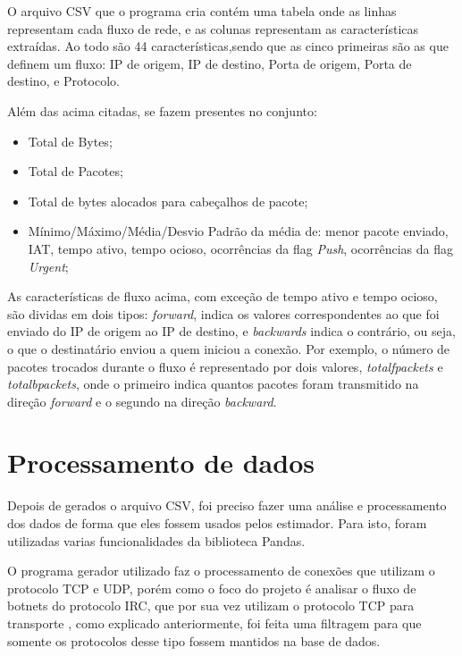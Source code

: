 O arquivo CSV que o programa cria contém uma tabela onde as linhas representam cada fluxo de rede, e as colunas representam as características extraídas. Ao todo são 44 características,sendo que as cinco primeiras são as que definem um fluxo: IP de origem, IP de destino, Porta de origem, Porta de destino, e Protocolo.

Além das acima citadas, se fazem presentes no conjunto:

\begin{itemize}
    \item Total de Bytes;
    \item Total de Pacotes;
    \item Total de bytes alocados para cabeçalhos de pacote;
    \item Mínimo/Máximo/Média/Desvio Padrão da média de: menor pacote enviado, IAT, tempo ativo, tempo ocioso, ocorrências da flag \textit{Push}, ocorrências da flag \textit{Urgent};
\end{itemize}

As características de fluxo acima, com exceção de tempo ativo e tempo ocioso, são dividas em dois tipos: \textit{forward}, indica os valores correspondentes ao que foi enviado do IP de origem ao IP de destino, e \textit{backwards} indica o contrário, ou seja, o que o destinatário enviou a quem iniciou a conexão. Por exemplo, o número de pacotes trocados durante o fluxo é representado por dois valores, \textit{totalfpackets} e \textit{totalbpackets}, onde o primeiro indica quantos pacotes foram transmitido na direção \textit{forward} e o segundo na direção \textit{backward}. 

\section{Processamento de dados}

Depois de gerados o arquivo CSV, foi preciso fazer uma análise e processamento dos dados de forma que eles fossem usados pelos estimador. Para isto, foram utilizadas varias funcionalidades da biblioteca Pandas.

O programa gerador utilizado faz o processamento de conexões que utilizam o protocolo TCP e UDP, porém como o foco do projeto é analisar o fluxo de botnets do protocolo IRC, que por sua vez utilizam o protocolo TCP para transporte \cite{livadas2006usilng}, como explicado anteriormente, foi feita uma filtragem para que somente os protocolos desse tipo fossem mantidos na base de dados. 

